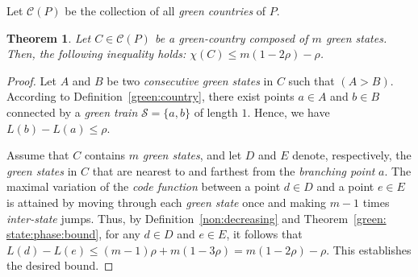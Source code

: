 \documentclass[12pt,reqno]{amsart}
\newtheorem{theorem}{Theorem}[section]
\theoremstyle{definition}
\theoremstyle{remark}
\theoremstyle{assumption}
\numberwithin{equation}{section}
\begin{document}
Let $\mathcal{C}(P)$ be the collection of all \emph{green countries} of $P$. 





\begin{theorem}\label{green:country:phase:bound:1}
	Let $C \in \mathcal{C}(P)$ be a green-country composed of $m$ green states. Then, the following inequality holds:
	$\chi(C) \leqslant m(1 - 2\rho) - \rho$. 
\end{theorem}

\begin{proof}
	Let $A$ and $B$ be two \emph{consecutive green states} in $C$ such that $(A > B)$.  
	According to Definition~\ref{green:country}, there exist points $a \in A$ and $b \in B$ connected by a \emph{green train} $\mathcal{S} = \{a, b\}$ of length $1$.  
	Hence, we have $L(b) - L(a) \leqslant \rho$.
	
	Assume that $C$ contains $m$ \emph{green states}, and let $D$ and $E$ denote, respectively, the \emph{green states} in $C$ that are nearest to and farthest from the \emph{branching point} $a$. The maximal variation of the \emph{code function} between a point $d\in D$ and a point $e\in E$ is attained by moving through each \emph{green state} once and making  $m-1$ times \emph{inter-state} jumps. Thus, by   Definition~\ref{non:decreasing} and  Theorem~\ref{green: state:phase:bound},  for any $d \in D$ and $e \in E$, it follows that $L(d) - L(e) \leqslant (m - 1)\rho + m(1 - 3\rho) = m(1 - 2\rho) - \rho$. 
	This establishes the desired bound.
\end{proof}
\end{document}
